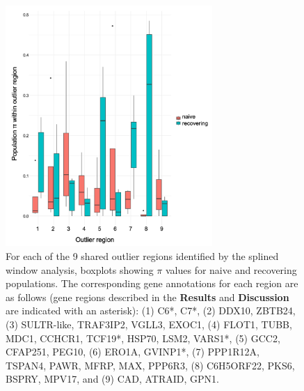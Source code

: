 \documentclass[9pt,twoside,lineno]{pnas-new-SI}
\begin{document}
\newpage

\begin{figure}

{\centering \includegraphics[width=0.70\textwidth]{figures/boxplot_pi_by_regionpop.png}

}

\caption{\label{fig-boxplot-pi-by-regionpop}For each of the 9 shared
outlier regions identified by the splined window analysis, boxplots
showing \(\pi\) values for naive and recovering populations. The
corresponding gene annotations for each region are as follows (gene
regions described in the \textbf{Results} and \textbf{Discussion} are
indicated with an asterisk): (1) C6*, C7*, (2) DDX10, ZBTB24, (3)
SULTR-like, TRAF3IP2, VGLL3, EXOC1, (4) FLOT1, TUBB, MDC1, CCHCR1,
TCF19*, HSP70, LSM2, VARS1*, (5) GCC2, CFAP251, PEG10, (6) ERO1A,
GVINP1*, (7) PPP1R12A, TSPAN4, PAWR, MFRP, MAX, PPP6R3, (8) C6H5ORF22,
PKS6, BSPRY, MPV17, and (9) CAD, ATRAID, GPN1.}

\end{figure}\clearpage

\newpage
\end{document}
